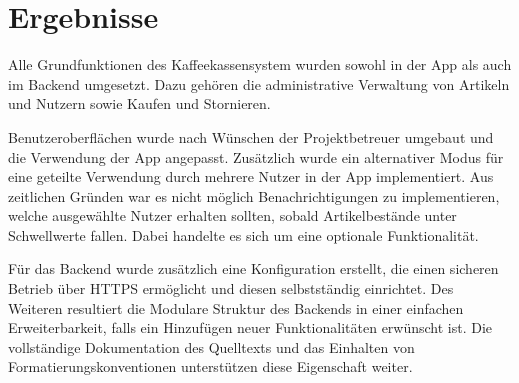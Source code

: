 \section{Ergebnisse}
\label{sec:results}
Alle Grundfunktionen des Kaffeekassensystem wurden sowohl in der App als auch im Backend umgesetzt.
Dazu gehören die administrative Verwaltung von Artikeln und Nutzern sowie Kaufen und Stornieren.

Benutzeroberflächen wurde nach Wünschen der Projektbetreuer umgebaut und die Verwendung der App angepasst.
Zusätzlich wurde ein alternativer Modus für eine geteilte Verwendung durch mehrere Nutzer in der App implementiert.
Aus zeitlichen Gründen war es nicht möglich Benachrichtigungen zu implementieren, welche ausgewählte Nutzer erhalten sollten, sobald Artikelbestände unter Schwellwerte fallen.
Dabei handelte es sich um eine optionale Funktionalität.

Für das Backend wurde zusätzlich eine Konfiguration erstellt, die einen sicheren Betrieb über HTTPS ermöglicht und diesen selbstständig einrichtet.
Des Weiteren resultiert die Modulare Struktur des Backends in einer einfachen Erweiterbarkeit, falls ein Hinzufügen neuer Funktionalitäten erwünscht ist.
Die vollständige Dokumentation des Quelltexts und das Einhalten von Formatierungskonventionen unterstützen diese Eigenschaft weiter.
